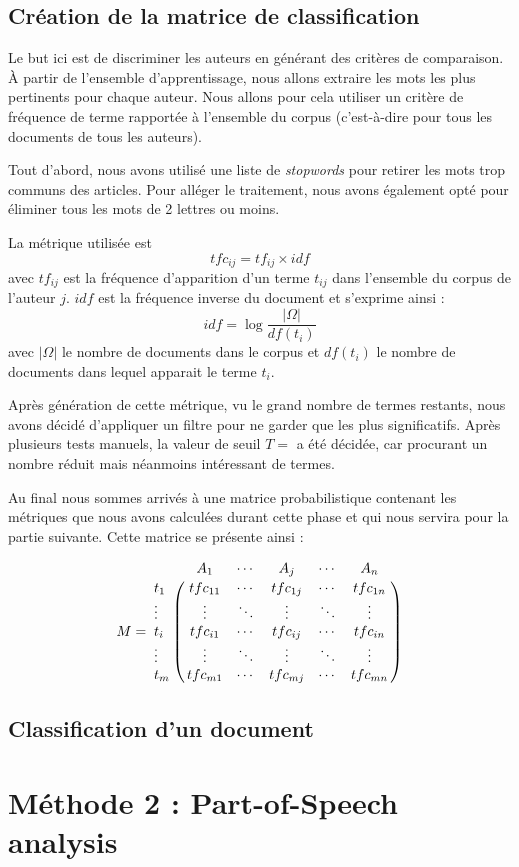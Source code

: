 \documentclass[a4paper]{article}
\begin{document}
\subsection{Création de la matrice de classification}
Le but ici est de discriminer les auteurs en générant des critères de comparaison. À partir de l'ensemble d'apprentissage, nous allons extraire les mots les plus pertinents pour chaque auteur. Nous allons pour cela utiliser un critère de fréquence de terme rapportée à l'ensemble du corpus (c'est-à-dire pour tous les documents de tous les auteurs).

Tout d'abord, nous avons utilisé une liste de \textit{stopwords} pour retirer les mots trop communs des articles. Pour alléger le traitement, nous avons également opté pour éliminer tous les mots de 2 lettres ou moins. 

La métrique utilisée est \[ tfc_{ij} = tf_{ij} \times idf\] avec $tf_{ij}$ est la fréquence d'apparition d'un terme $t_{ij}$ dans l'ensemble du corpus de l'auteur $j$. $idf$ est la fréquence inverse du document et s'exprime ainsi : \[idf = \log \frac{|\Omega|}{df(t_{i})} \] avec $|\Omega|$ le nombre de documents dans le corpus et $df(t_{i})$ le nombre de documents dans lequel apparait le terme $t_{i}$.

Après génération de cette métrique, vu le grand nombre de termes restants, nous avons décidé d'appliquer un filtre pour ne garder que les plus significatifs. Après plusieurs tests manuels, la valeur de seuil $T = $  a été décidée, car procurant un nombre réduit mais néanmoins intéressant de termes.

Au final nous sommes arrivés à une matrice probabilistique contenant les métriques que nous avons calculées durant cette phase et qui nous servira pour la partie suivante. Cette matrice se présente ainsi :

\[M=\bordermatrix{
&A_{1}&\cdots&A_{j}&\cdots&A_{n}\cr
t_{1}& tfc_{11} & \cdots & tfc_{1j} & \cdots & tfc_{1n} \cr
\vdots&\vdots&\ddots&\vdots&\ddots&\vdots\cr
t_{i}& tfc_{i1} & \cdots & tfc_{ij} & \cdots & tfc_{in} \cr
\vdots&\vdots&\ddots&\vdots&\ddots&\vdots\cr
t_{m}& tfc_{m1} & \cdots & tfc_{mj} & \cdots & tfc_{mn} \cr
}\]
\subsection{Classification d'un document}

\section{Méthode 2 : Part-of-Speech analysis}
\end{document}
